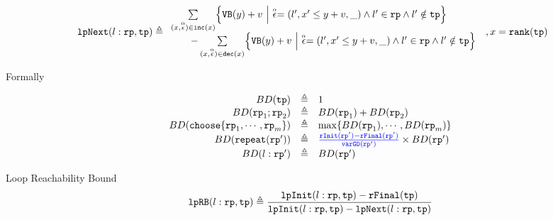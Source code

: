 \begin{defn}
\begin{itemize}
%
\[
  \begin{array}{l}
  \lpnext(l: \rprog, \tpath) \triangleq 
    \begin{array}{l}
  \sum\limits_{(x, \absevent) \in \inc(x) }
  \left\{ 
    \varinvar(y) + v ~\middle\vert~ \absevent = (l', x' \leq y + v, \_) \land  l' \in \rprog 
    \land l' \notin \tpath \right\}
    \\ \qquad 
    - \sum\limits_{(x, \absevent) \in \dec(x) }\left\{ 
      \varinvar(y) + v 
      ~\middle\vert~ \absevent = (l', x' \leq y + v, \_) \land l' \in \rprog \land l' \notin \tpath \right\}
    \end{array}
  \end{array}
  , x = \locbound(\tpath)
  \]
    \end{itemize}
\end{defn}

Formally
\begin{defn}
\label{def:loopbound}
\[
  \begin{array}{rcl}
    BD(\tpath) & \triangleq & 1 \\
    BD(\rprog_1;\rprog_2) & \triangleq & BD(\rprog_1) + BD(\rprog_2) \\
    BD(\rpchoose{\rprog_1, \cdots, \rprog_m }) & \triangleq 
    & \max\left\{ BD(\rprog_1), \cdots, BD(\rprog_m) \right\} \\
    BD(\rprepeat(\rprog')) & \triangleq 
    &
    \highlight{\frac{\rfinit(\rprog') - \rffinal(\rprog')}{\varGD(\rprog')}}
     \times BD(\rprog')
     \\
    BD(l: \rprog') & \triangleq & BD(\rprog')
  \end{array}
  \]
\end{defn}

\begin{defn}
  \label{def:looprb}
  Loop Reachability Bound
  \[
    \mathtt{lpRB}(l: \mathtt{rp}, \mathtt{tp}) \triangleq
      \frac{\mathtt{lpInit}(l: \mathtt{rp}, \mathtt{tp}) - \mathtt{rFinal}(\mathtt{tp})}{\mathtt{lpInit}(l: \mathtt{rp}, \mathtt{tp}) - \mathtt{lpNext}(l: \mathtt{rp}, \mathtt{tp})}
  \]
\end{defn}